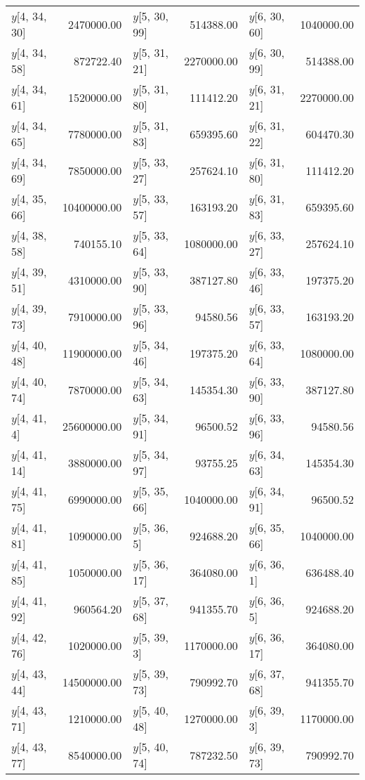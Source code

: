 \begin{longtable}{lrlrlr}
$y$[4, 34, 30] & 2470000.00 & $y$[5, 30, 99] & 514388.00 & $y$[6, 30, 60] & 1040000.00 \\
$y$[4, 34, 58] & 872722.40 & $y$[5, 31, 21] & 2270000.00 & $y$[6, 30, 99] & 514388.00 \\
$y$[4, 34, 61] & 1520000.00 & $y$[5, 31, 80] & 111412.20 & $y$[6, 31, 21] & 2270000.00 \\
$y$[4, 34, 65] & 7780000.00 & $y$[5, 31, 83] & 659395.60 & $y$[6, 31, 22] & 604470.30 \\
$y$[4, 34, 69] & 7850000.00 & $y$[5, 33, 27] & 257624.10 & $y$[6, 31, 80] & 111412.20 \\
$y$[4, 35, 66] & 10400000.00 & $y$[5, 33, 57] & 163193.20 & $y$[6, 31, 83] & 659395.60 \\
$y$[4, 38, 58] & 740155.10 & $y$[5, 33, 64] & 1080000.00 & $y$[6, 33, 27] & 257624.10 \\
$y$[4, 39, 51] & 4310000.00 & $y$[5, 33, 90] & 387127.80 & $y$[6, 33, 46] & 197375.20 \\
$y$[4, 39, 73] & 7910000.00 & $y$[5, 33, 96] & 94580.56 & $y$[6, 33, 57] & 163193.20 \\
$y$[4, 40, 48] & 11900000.00 & $y$[5, 34, 46] & 197375.20 & $y$[6, 33, 64] & 1080000.00 \\
$y$[4, 40, 74] & 7870000.00 & $y$[5, 34, 63] & 145354.30 & $y$[6, 33, 90] & 387127.80 \\
$y$[4, 41, 4] & 25600000.00 & $y$[5, 34, 91] & 96500.52 & $y$[6, 33, 96] & 94580.56 \\
$y$[4, 41, 14] & 3880000.00 & $y$[5, 34, 97] & 93755.25 & $y$[6, 34, 63] & 145354.30 \\
$y$[4, 41, 75] & 6990000.00 & $y$[5, 35, 66] & 1040000.00 & $y$[6, 34, 91] & 96500.52 \\
$y$[4, 41, 81] & 1090000.00 & $y$[5, 36, 5] & 924688.20 & $y$[6, 35, 66] & 1040000.00 \\
$y$[4, 41, 85] & 1050000.00 & $y$[5, 36, 17] & 364080.00 & $y$[6, 36, 1] & 636488.40 \\
$y$[4, 41, 92] & 960564.20 & $y$[5, 37, 68] & 941355.70 & $y$[6, 36, 5] & 924688.20 \\
$y$[4, 42, 76] & 1020000.00 & $y$[5, 39, 3] & 1170000.00 & $y$[6, 36, 17] & 364080.00 \\
$y$[4, 43, 44] & 14500000.00 & $y$[5, 39, 73] & 790992.70 & $y$[6, 37, 68] & 941355.70 \\
$y$[4, 43, 71] & 1210000.00 & $y$[5, 40, 48] & 1270000.00 & $y$[6, 39, 3] & 1170000.00 \\
$y$[4, 43, 77] & 8540000.00 & $y$[5, 40, 74] & 787232.50 & $y$[6, 39, 73] & 790992.70 \\

\end{longtable}

